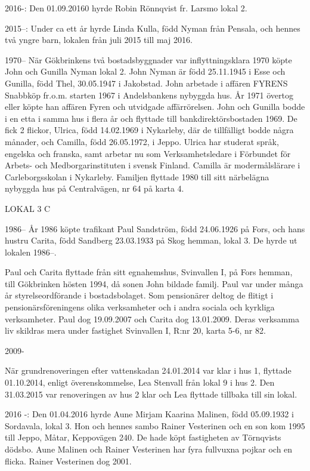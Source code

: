 2016-: Den 01.09.20160 hyrde Robin Rönnqvist fr. Larsmo lokal 2.

2015--: Under ca ett år hyrde Linda Kulla, född Nyman från Pensala, och hennes två yngre barn, lokalen från juli 2015 till maj 2016.

 1970--
När Gökbrinkens två bostadsbyggnader var inflyttningsklara 1970 köpte John och Gunilla Nyman lokal 2. John Nyman är född 25.11.1945 i Esse och Gunilla, född Thel, 30.05.1947 i Jakobstad. John arbetade i affären FYRENS Snabbköp fr.o.m. starten 1967 i Andelsbankens nybyggda hus. År 1971 övertog eller köpte han affären Fyren och utvidgade affärrörelsen. John och Gunilla bodde i en etta i samma hus i flera år och flyttade till bankdirektörsbostaden 1969. De fick 2 flickor, Ulrica, född 14.02.1969 i Nykarleby, där de tillfälligt bodde några månader, och Camilla, född 26.05.1972, i Jeppo.  Ulrica har studerat språk, engelska och franska, samt arbetar nu som Verksamhetsledare i Förbundet för Arbets- och Medborgarinstituten i svensk Finland.  Camilla är modermålslärare i Carleborgsskolan i Nykarleby. Familjen flyttade 1980 till sitt närbelägna nybyggda hus på Centralvägen, nr 64 på karta 4.


LOKAL 3 C

 1986--
År 1986 köpte trafikant Paul Sandström, född 24.06.1926 på Fors, och hans hustru Carita, född Sandberg 23.03.1933 på Skog hemman, lokal 3. De hyrde ut lokalen 1986--.

Paul och Carita flyttade från sitt egnahemshus, Svinvallen I, på Fors hemman, till Gökbrinken hösten 1994, då sonen John bildade familj. Paul var under många år styrelseordförande i bostadsbolaget. Som pensionärer deltog de flitigt i pensionärsföreningens olika verksamheter och i andra sociala och kyrkliga verksamheter. Paul dog 19.09.2007 och Carita dog 13.01.2009. Deras verksamma liv skildras mera under fastighet Svinvallen I, R:nr 20, karta 5-6, nr 82.

 2009-

När grundrenoveringen efter vattenskadan 24.01.2014 var klar i hus 1, flyttade 01.10.2014, enligt överenskommelse, Lea Stenvall från lokal 9 i hus 2. Den 31.03.2015 var renoveringen av hus 2 klar och Lea flyttade tillbaka till sin lokal.

2016 -: Den 01.04.2016 hyrde Aune Mirjam Kaarina Malinen, född 05.09.1932 i Sordavala, lokal 3. Hon och hennes sambo Rainer Vesterinen och en son kom 1995 till Jeppo, Måtar, Keppovägen 240. De hade köpt fastigheten av Törnqvists dödsbo. Aune Malinen och Rainer Vesterinen har fyra fullvuxna pojkar och en flicka. Rainer Vesterinen dog 2001.

